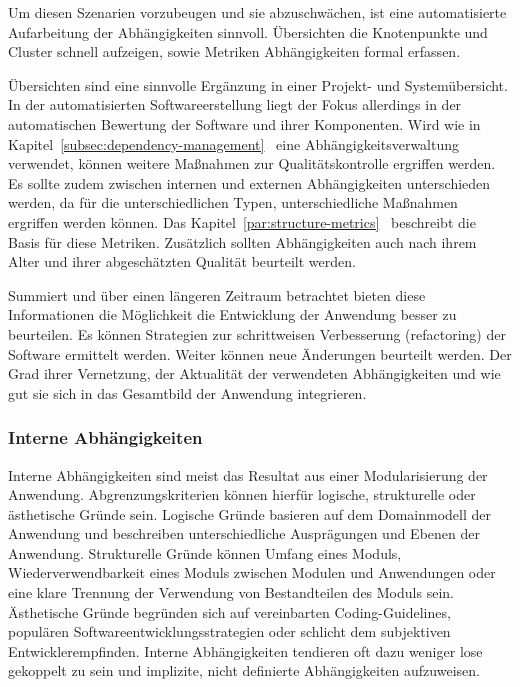 Um diesen Szenarien vorzubeugen und sie abzuschwächen, ist eine automatisierte Aufarbeitung der Abhängigkeiten sinnvoll. Übersichten die Knotenpunkte und Cluster schnell aufzeigen, sowie Metriken Abhängigkeiten formal erfassen.

Übersichten sind eine sinnvolle Ergänzung in einer Projekt- und Systemübersicht. In der automatisierten Softwareerstellung liegt der Fokus allerdings in der automatischen Bewertung der Software und ihrer Komponenten. Wird wie in Kapitel~\ref{subsec:dependency-management}~ eine Abhängigkeitsverwaltung verwendet, können weitere Maßnahmen zur Qualitätskontrolle ergriffen werden. Es sollte zudem zwischen internen und externen Abhängigkeiten unterschieden werden, da für die unterschiedlichen Typen, unterschiedliche Maßnahmen ergriffen werden können. Das Kapitel~\ref{par:structure-metrics}~ beschreibt die Basis für diese Metriken. Zusätzlich sollten Abhängigkeiten auch nach ihrem Alter und ihrer abgeschätzten Qualität beurteilt werden.

Summiert und über einen längeren Zeitraum betrachtet bieten diese Informationen die Möglichkeit die Entwicklung der Anwendung besser zu beurteilen. Es können Strategien zur schrittweisen Verbesserung (refactoring) der Software ermittelt werden. Weiter können neue Änderungen beurteilt werden. Der Grad ihrer Vernetzung, der Aktualität der verwendeten Abhängigkeiten und wie gut sie sich in das Gesamtbild der Anwendung integrieren.

\subsubsection{Interne Abhängigkeiten}

Interne Abhängigkeiten sind meist das Resultat aus einer Modularisierung der Anwendung. Abgrenzungskriterien können hierfür logische, strukturelle oder ästhetische Gründe sein. Logische Gründe basieren auf dem Domainmodell der Anwendung und beschreiben unterschiedliche Ausprägungen und Ebenen der Anwendung. Strukturelle Gründe können Umfang eines Moduls, Wiederverwendbarkeit eines Moduls zwischen Modulen und Anwendungen oder eine klare Trennung der Verwendung von Bestandteilen des Moduls sein. Ästhetische Gründe begründen sich auf vereinbarten Coding-Guidelines, populären Softwareentwicklungsstrategien oder schlicht dem subjektiven Entwicklerempfinden. Interne Abhängigkeiten tendieren oft dazu weniger lose gekoppelt zu sein und implizite, nicht definierte Abhängigkeiten aufzuweisen.

